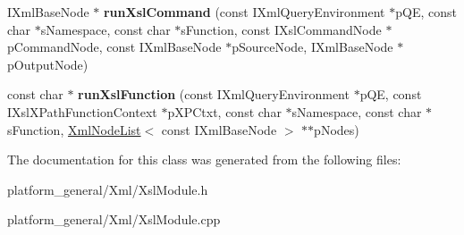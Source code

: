 \begin{DoxyCompactItemize}
\item 
\hypertarget{classgeneral__server_1_1XslModule_a86c29628333e999ed17066c66d506cca}{\-I\-Xml\-Base\-Node $\ast$ {\bfseries run\-Xsl\-Command} (const \-I\-Xml\-Query\-Environment $\ast$p\-Q\-E, const char $\ast$s\-Namespace, const char $\ast$s\-Function, const \-I\-Xsl\-Command\-Node $\ast$p\-Command\-Node, const \-I\-Xml\-Base\-Node $\ast$p\-Source\-Node, \-I\-Xml\-Base\-Node $\ast$p\-Output\-Node)}\label{classgeneral__server_1_1XslModule_a86c29628333e999ed17066c66d506cca}

\item 
\hypertarget{classgeneral__server_1_1XslModule_ab90cb82754b7d2307cea253470cba8b5}{const char $\ast$ {\bfseries run\-Xsl\-Function} (const \-I\-Xml\-Query\-Environment $\ast$p\-Q\-E, const \-I\-Xsl\-X\-Path\-Function\-Context $\ast$p\-X\-P\-Ctxt, const char $\ast$s\-Namespace, const char $\ast$s\-Function, \hyperlink{classgeneral__server_1_1XmlNodeList}{\-Xml\-Node\-List}$<$ const \-I\-Xml\-Base\-Node $>$ $\ast$$\ast$p\-Nodes)}\label{classgeneral__server_1_1XslModule_ab90cb82754b7d2307cea253470cba8b5}

\end{DoxyCompactItemize}


\-The documentation for this class was generated from the following files\-:\begin{DoxyCompactItemize}
\item 
platform\-\_\-general/\-Xml/\-Xsl\-Module.\-h\item 
platform\-\_\-general/\-Xml/\-Xsl\-Module.\-cpp\end{DoxyCompactItemize}
